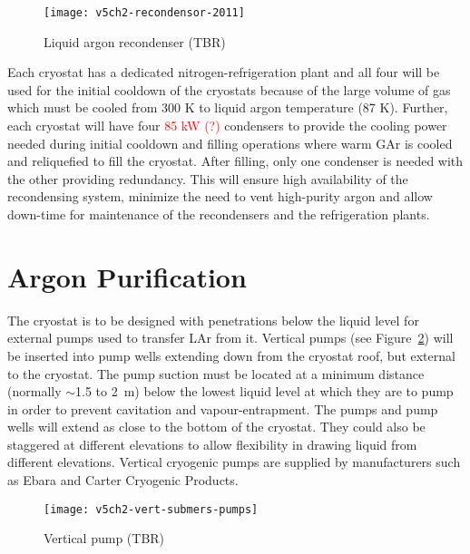 \begin{figure}[htbp]
\centering
\texttt{[image: v5ch2-recondensor-2011]}
\caption{Liquid argon recondenser (TBR)}
\label{fig:v5ch2-recondenser-sept-2011}
\end{figure}

Each cryostat has a dedicated nitrogen-refrigeration plant 
and all four will be used for the initial 
cooldown of the cryostats because of the large volume of 
gas which must be cooled from 300 K to liquid
argon temperature (87 K). Further, each cryostat will
have four \textcolor{red}{85 kW (?)} condensers to 
provide the cooling power needed during initial 
cooldown and filling operations where warm GAr
is cooled and reliquefied to fill the cryostat.
After filling, only one condenser is needed with the
other providing redundancy.
This will ensure high availability of the recondensing 
system, minimize the need to vent high-purity argon 
and allow down-time for maintenance of
the recondensers and the refrigeration plants. 

\section{Argon Purification}
\label{subsec:argon-pur}
The cryostat is to be designed with penetrations below the liquid level 
for external pumps used to transfer LAr from it. Vertical 
pumps (see Figure~\ref{fig:vert-submers-pumps}) will be inserted into 
pump wells extending down from the cryostat roof, 
but external to the cryostat.  The pump suction 
must be located at a minimum distance (normally $\sim$1.5 to 2~m) below 
the lowest liquid level at which they are to pump in order to prevent 
cavitation and vapour-entrapment. The pumps and pump wells will extend 
as close to the bottom of the cryostat.  They 
could also be staggered at different elevations to allow flexibility 
in drawing liquid from different 
elevations. Vertical cryogenic pumps are supplied by manufacturers 
such as Ebara and Carter Cryogenic Products. 

\begin{figure}[htbp]
\centering
\texttt{[image: v5ch2-vert-submers-pumps]}
\caption{Vertical pump (TBR) }
\label{fig:vert-submers-pumps}
\end{figure}

